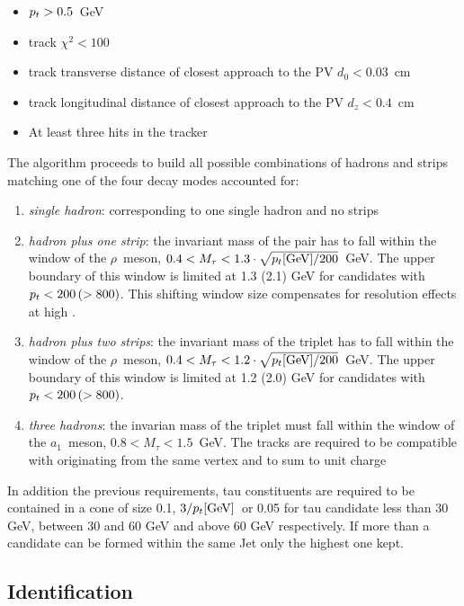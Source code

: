 \begin{itemize}
\item $p_{t} > 0.5$\ GeV
\item track $\chi^2 < 100$
\item track transverse distance of closest approach to the PV $d_0 < 0.03$\ cm
\item track longitudinal distance of closest approach to the PV $d_z < 0.4$\ cm
\item At least three hits in the tracker
\end{itemize}

The algorithm proceeds to build all possible combinations of hadrons and strips matching one of the four decay modes accounted for:

\begin{enumerate}
\item \emph{single hadron}: corresponding to one single hadron and no strips
\item \emph{hadron plus one strip}: the invariant mass of the pair has to fall within the window of the $\rho$\ meson, $0.4 < M_{\tau} < 1.3 \cdot \sqrt{p_{t} \mathrm{[GeV]} / 200}$\ GeV. The upper boundary of this window is limited at 1.3 (2.1) GeV for candidates with $p_{t} < 200 \, (> 800)$. This shifting window size compensates for resolution effects at high \pT.
\item \emph{hadron plus two strips}: the invariant mass of the triplet has to fall within the window of the $\rho$\ meson, $0.4 < M_{\tau} < 1.2 \cdot \sqrt{p_{t} \mathrm{[GeV]} / 200}$\ GeV. The upper boundary of this window is limited at 1.2 (2.0) GeV for candidates with $p_{t} < 200 \, (> 800)$.
\item \emph{three hadrons}: the invarian mass of the triplet must fall within the window of the $a_1$\ meson, $0.8 < M_{\tau} < 1.5$\ GeV. The tracks are required to be compatible with originating from the same vertex and to sum to unit charge
\end{enumerate}

In addition the previous requirements, tau constituents are required to be contained in a cone of size 0.1, $3 / p_{t} \mathrm{[GeV]}$\ or 0.05 for tau candidate \pT less than 30 GeV, between 30 and 60 GeV and above 60 GeV respectively. If more than a candidate can be formed within the same Jet only the highest \pT one kept.

\subsection{Identification}

